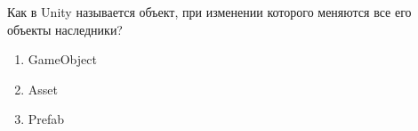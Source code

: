 
Как в Unity называется объект, при изменении которого меняются все его объекты наследники?

\begin{enumerate}
    \item GameObject
    \item Asset
    \item Prefab
\end{enumerate}


